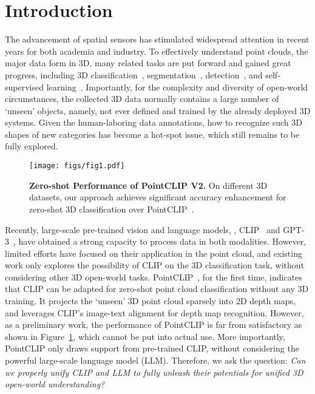 \documentclass[10pt,twocolumn,letterpaper]{article}
\begin{document}
\section{Introduction}
\label{sec:intro}

The advancement of spatial sensors has stimulated widespread attention in recent years for both academia and industry. To effectively understand point clouds, the major data form in 3D, many related tasks are put forward and gained great progress, including 3D classification~\cite{qi2016pointnet, wu2019pointconv, zhang2023parameter}, segmentation~\cite{qi2017pointnet++, Xiang2021Walk, wang2019dynamic,wu2022eda}, detection~\cite{xu2020squeezesegv3, meng2021towards}, and self-supervised learning~\cite{zhang2022learning,guo2023joint,zhang2022point,fu2022pos}. Importantly, for the complexity and diversity of open-world circumstances, the collected 3D data normally contains a large number of `unseen' objects, namely, not ever defined and trained by the already deployed 3D systems. Given the human-laboring data annotations, how to recognize such 3D shapes of new categories has become a hot-spot issue, which still remains to be fully explored.

\begin{figure}[t!]
\centering
\texttt{[image: figs/fig1.pdf]}
\vspace{0.1cm}
\caption{\textbf{Zero-shot Performance of PointCLIP V2.} On different 3D datasets, our approach achieves significant accuracy enhancement for zero-shot 3D classification over PointCLIP~\cite{zhang2022pointclip}.}
\label{fig1}
\vspace{-0.2cm}
\end{figure}

Recently, large-scale pre-trained vision and language models, \eg, CLIP~\cite{radford2021learning} and GPT-3~\cite{brown2020language}, have obtained a strong capacity to process data in both modalities. However, limited efforts have focused on their application in the point cloud, and existing work only explores the possibility of CLIP on the 3D classification task, without considering other 3D open-world tasks. PointCLIP~\cite{zhang2022pointclip}, for the first time, indicates that CLIP can be adapted for zero-shot point cloud classification without any 3D training. It projects the `unseen' 3D point cloud sparsely into 2D depth maps, and leverages CLIP's image-text alignment for depth map recognition.  
However, as a preliminary work, the performance of PointCLIP is far from satisfactory as shown in Figure~\ref{fig1}, which cannot be put into actual use. More importantly, PointCLIP only draws support from pre-trained CLIP, without considering the powerful large-scale language model (LLM).
Therefore, we ask the question: \textit{Can we properly unify CLIP and LLM to fully unleash their potentials for unified 3D open-world understanding?}
\end{document}
